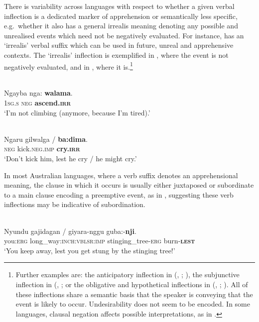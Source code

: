 \documentclass[output=paper,colorlinks,citecolor=brown]{langscibook}
\begin{document}
\largerpage
 There is variability across languages with respect to whether a given verbal inflection is a dedicated marker of apprehension or semantically less specific, e.g.\   whether it also has a general irrealis meaning denoting any possible and unrealised events which need not be negatively evaluated. For instance,  has an `irrealis' verbal suffix which can be used in future, unreal and apprehensive contexts. The `irrealis' inflection is exemplified in , where the event is not negatively evaluated, and in , where it is.\footnote{Further examples are: the anticipatory inflection in  (, ; \cite{ennever_nominal_2018}), the subjunctive inflection in  (, ; \citep[39]{burridge_yulparija_1996} or the obligative and hypothetical inflections in  (, ; \cite[201--202]{jones_grammar_2011}). All of these inflections share a semantic basis that the speaker is conveying that the event is likely to occur. Undesirability does not seem to be encoded. In some languages, clausal negation affects possible interpretations, as in  \citep[335--339]{agnew_core_2020}.}

\ea
{} \\
\gll Ngayba nga: \textbf{walama}. \\
\textsc{1sg.s} \textsc{neg} \textbf{ascend.\textsc{irr}} \\
\glt `I'm not climbing (anymore, because I'm tired).'
\label{ex:bro9}
\z

\ea
{} \\
\gll Ngaru {gilwalga \textnormal{/}} \textbf{ba:dima}. \\
\textsc{neg} kick.\textsc{neg.imp} \textbf{cry.\textsc{irr}} \\
\glt `Don't kick him, lest he cry / he might cry.'
\label{ex:bro10}
\z

In most Australian languages, where a verb suffix denotes an apprehensional meaning, the clause in which it occurs is usually either juxtaposed or subordinate to a main clause encoding a preemptive event, as in , suggesting these verb inflections may be indicative of subordination.


\ea 
{} {\citealt[351]{dixon_grammar_1977}} \\
\gll Nyundu {gajidagan \textnormal{/}} giyara-nggu guba:-\textbf{nji}. \\
you:\textsc{erg} long\_way:\textsc{inch:vblsr:imp} stinging\_tree-\textsc{erg} burn-\textbf{\textsc{lest}} \\
\glt `You keep away, lest you get stung by the stinging tree!'
\label{ex:bro11}
\z
\end{document}
